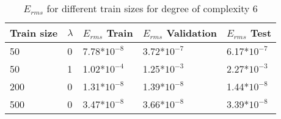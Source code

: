 \begin{table}[H]
\centering
\begin{tabular}{l l l l l}
\hline
\hline
\textbf{Train size} & \textbf{$\lambda$} & \textbf{$E_{rms}$ Train} & \textbf{$E_{rms}$ Validation} & \textbf{$E_{rms}$ Test}\\
\hline
\hline
50 & 0 & 7.78*$10^{-8}$ & 3.72*$10^{-7}$ & 6.17*$10^{-7}$  \\
50 & 1 & 1.02*$10^{-4}$ & 1.25*$10^{-3}$ & 2.27*$10^{-3}$ \\
200 & 0 & 1.31*$10^{-8}$ & 1.39*$10^{-8}$ & 1.44*$ 10^{-8}$  \\
500 & 0 & 3.47*$10^{-8}$ & 3.66*$10^{-8}$ & 3.39*$10^{-8}$\\
\hline
\end{tabular}
\caption{$E_{rms}$ for different train sizes for degree of complexity 6}
\end{table}

